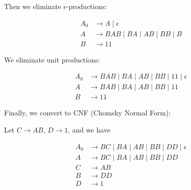\documentclass[a4paper, UTF-8]{article}
\theoremstyle{plain}
\begin{document}
Then we eliminate $\epsilon$-productions:

\begin{align*} 
A_0 &\to A \mid \epsilon \\ 
A &\to B A B \mid BA \mid AB \mid BB \mid B\\
B &\to 11 
\end{align*}

We eliminate unit productions:

\begin{align*} 
A_0 &\to B A B \mid BA \mid AB \mid BB \mid 11 \mid \epsilon \\ 
A &\to B A B \mid BA \mid AB \mid BB \mid 11\\
B &\to 11 
\end{align*}

Finally, we convert to CNF (Chomsky Normal Form):

Let $C \to AB$, $D \to 1$, and we have 

\begin{align*} 
A_0 &\to BC \mid BA \mid AB \mid BB \mid DD \mid \epsilon \\ 
A &\to B C \mid BA \mid AB \mid BB \mid DD\\
C &\to AB \\
B &\to DD \\
D &\to 1 \\
\end{align*}
\end{document}
